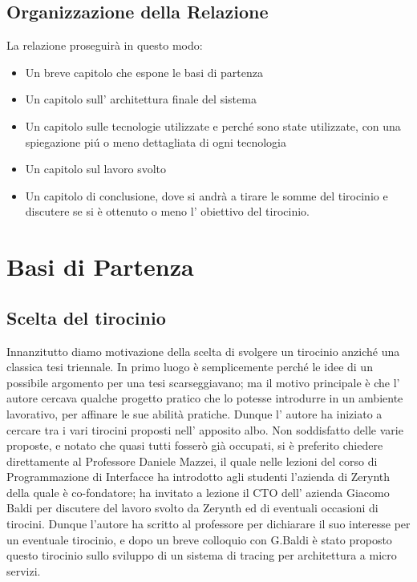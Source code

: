 \documentclass[a4paper,12pt,titlepage,italian,openany]{report}
\begin{document}
\section{Organizzazione della Relazione}
La relazione proseguirà in questo modo:
\begin{itemize}
    \item Un breve capitolo che espone le basi di partenza
    \item Un capitolo sull' architettura finale del sistema
    \item Un capitolo sulle tecnologie utilizzate e perché sono state utilizzate, con una spiegazione piú o meno dettagliata di ogni tecnologia
    \item Un capitolo sul lavoro svolto 
    \item Un capitolo di conclusione, dove si andrà a tirare le somme del tirocinio e discutere se si è ottenuto o meno l' obiettivo del tirocinio.
\end{itemize}



\chapter{Basi di Partenza}
\section{Scelta del tirocinio}
Innanzitutto diamo motivazione della scelta di svolgere un tirocinio anziché una classica tesi triennale. In primo luogo è semplicemente perché le idee di un possibile argomento
per una tesi scarseggiavano; ma il motivo principale è che l' autore cercava qualche progetto pratico che lo potesse introdurre in un ambiente lavorativo, per affinare le sue abilità pratiche. Dunque l' autore ha iniziato a cercare tra i vari tirocini proposti nell' apposito albo. Non soddisfatto delle varie proposte, e notato che quasi tutti fosserò già occupati, si è preferito chiedere direttamente al Professore Daniele Mazzei, il quale nelle lezioni del corso di Programmazione di Interfacce ha introdotto agli studenti l'azienda di Zerynth della quale è co-fondatore; ha invitato a lezione 
il CTO dell' azienda Giacomo Baldi per discutere del lavoro svolto da Zerynth ed di eventuali occasioni di tirocini. Dunque l'autore ha scritto al professore per dichiarare il suo interesse per un eventuale tirocinio, e dopo un breve colloquio con G.Baldi è stato proposto questo tirocinio sullo sviluppo di un sistema di tracing per architettura a micro servizi.
\end{document}
